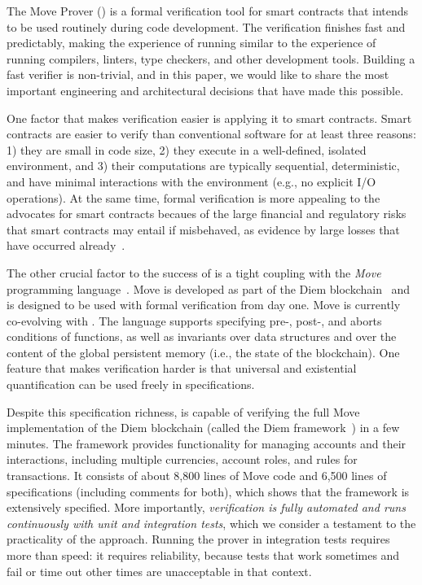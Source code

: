 
The Move Prover (\MVP) is a formal verification tool for smart contracts that
intends to be used routinely during code development.  The verification finishes
fast and predictably, making the experience of running \MVP similar to the
experience of running compilers, linters, type checkers, and other development
tools.  Building a fast verifier is non-trivial, and in this paper, we would
like to share the most important engineering and architectural decisions that
have made this possible.

One factor that makes verification easier is applying it to smart contracts.
Smart contracts are easier to verify than conventional software for at least
three reasons: 1) they are small in code size, 2) they execute in a
well-defined, isolated environment, and 3) their computations are typically
sequential, deterministic, and have minimal interactions with the environment
(e.g., no explicit I/O operations).  At the same time, formal verification is
more appealing to the advocates for smart contracts becaues of the large
financial and regulatory risks that smart contracts may entail if misbehaved, as
evidence by large losses that have occurred
already~\cite{CONTRACT_VERIFICATION,hacks-on-smart-contracts,hacks-on-compound}.

The other crucial factor to the success of \MVP is a tight coupling with the
\emph{Move} programming language~\cite{MOVE_LANG}.  Move is developed as part of
the Diem blockchain~\cite{DIEM} and is designed to be used with formal
verification from day one.  Move is currently co-evolving with \MVP.  The
language supports specifying pre-, post-, and aborts conditions of functions, as
well as invariants over data structures and over the content of the global
persistent memory (i.e., the state of the blockchain).  One feature that makes
verification harder is that universal and existential quantification can be used
freely in specifications.

Despite this specification richness, \MVP is capable of verifying the full Move
implementation of the Diem blockchain (called the Diem
framework~\cite{DIEM_FRAMEWORK}) in a few minutes.  The framework provides
functionality for managing accounts and their interactions, including multiple
currencies, account roles, and rules for transactions.  It consists of about
8,800 lines of Move code and 6,500 lines of specifications (including comments
for both), which shows that the framework is extensively specified.  More
importantly, \emph{verification is fully automated and runs continuously with
  unit and integration tests}, which we consider a testament to the practicality
of the approach.  Running the prover in integration tests requires more than
speed: it requires reliability, because tests that work sometimes and fail or
time out other times are unacceptable in that context.

